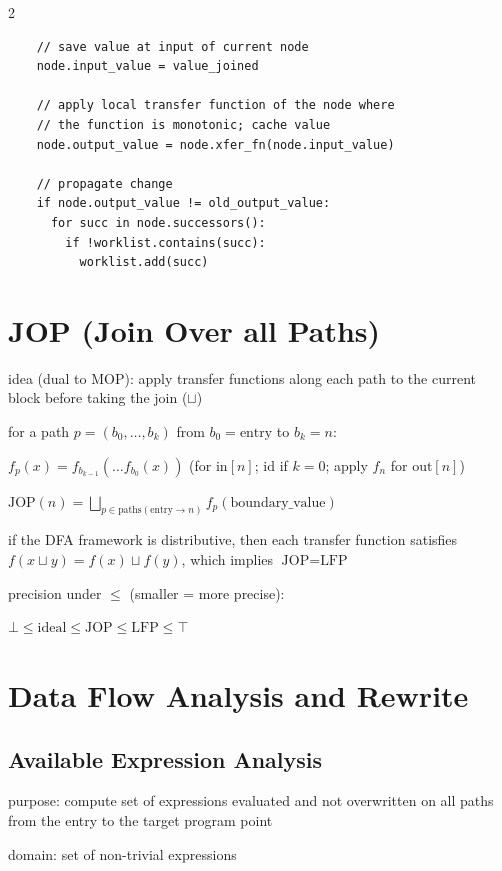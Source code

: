 \documentclass[8pt]{extarticle}
\begin{document}
\begin{multicols*}{2}
\begin{verbatim}
    // save value at input of current node
    node.input_value = value_joined

    // apply local transfer function of the node where
    // the function is monotonic; cache value
    node.output_value = node.xfer_fn(node.input_value)

    // propagate change
    if node.output_value != old_output_value:
      for succ in node.successors():
        if !worklist.contains(succ):
          worklist.add(succ)
  \end{verbatim}
  
  \section{JOP (Join Over all Paths)}

  idea (dual to MOP): apply transfer functions along each path to the current block before taking the join ($\sqcup$)

  for a path $p = (b_0, \dots, b_k)$ from $b_0 = \text{entry}$ to $b_k = n$:

  $f_p(x) = f_{b_{k-1}}(\dots f_{b_0}(x))$ (for $\text{in}[n]$; $\text{id}$ if $k{=}0$; apply $f_n$ for $\text{out}[n]$)

  $\text{JOP}(n) = \bigsqcup_{p \in \text{paths}(\text{entry} \to n)} f_p(\text{boundary\_value})$

  if the DFA framework is distributive, then each transfer function satisfies $f(x \sqcup y) = f(x) \sqcup f(y)$, which implies $\text{JOP} = \text{LFP}$

  precision under $\leq$ (smaller = more precise):

  $\bot \leq \text{ideal} \leq \text{JOP} \leq \text{LFP} \leq \top$

  \vfill\null
  \columnbreak

  \section{Data Flow Analysis and Rewrite}

  \subsection{Available Expression Analysis}

  purpose: compute set of expressions evaluated and not overwritten on all paths from the entry to the target program point
  
  domain: set of non-trivial expressions


\end{multicols*}
\end{document}
